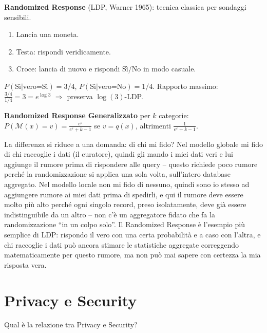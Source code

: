 \documentclass[a4paper,11pt]{article}
\begin{document}
\textbf{Randomized Response} (LDP, Warner 1965): tecnica classica per sondaggi sensibili.
\begin{enumerate}
  \item Lancia una moneta.
  \item Testa: rispondi veridicamente.
  \item Croce: lancia di nuovo e rispondi S\`{i}/No in modo casuale.
\end{enumerate}
$P(\text{S\`{i}}|\text{vero=S\`{i}}) = 3/4$, $P(\text{S\`{i}}|\text{vero=No}) = 1/4$. Rapporto massimo: $\frac{3/4}{1/4} = 3 = e^{\log 3}$ $\Rightarrow$ preserva $\log(3)$-LDP.

\textbf{Randomized Response Generalizzato} per $k$ categorie: $P(\mathcal{M}(x) = v) = \frac{e^\varepsilon}{e^\varepsilon + k - 1}$ se $v = q(x)$, altrimenti $\frac{1}{e^\varepsilon + k - 1}$.

\begin{nota}
La differenza si riduce a una domanda: di chi mi fido? Nel modello globale mi fido di chi raccoglie i dati (il curatore), quindi gli mando i miei dati veri e lui aggiunge il rumore prima di rispondere alle query -- questo richiede poco rumore perch\'{e} la randomizzazione si applica una sola volta, sull'intero database aggregato. Nel modello locale non mi fido di nessuno, quindi sono io stesso ad aggiungere rumore ai miei dati prima di spedirli, e qui il rumore deve essere molto pi\`{u} alto perch\'{e} ogni singolo record, preso isolatamente, deve gi\`{a} essere indistinguibile da un altro -- non c'\`{e} un aggregatore fidato che fa la randomizzazione ``in un colpo solo''. Il Randomized Response \`{e} l'esempio pi\`{u} semplice di LDP: rispondo il vero con una certa probabilit\`{a} e a caso con l'altra, e chi raccoglie i dati pu\`{o} ancora stimare le statistiche aggregate correggendo matematicamente per questo rumore, ma non pu\`{o} mai sapere con certezza la mia risposta vera.
\end{nota}

\section{Privacy e Security}

\begin{domanda}
Qual \`{e} la relazione tra Privacy e Security?
\end{domanda}
\end{document}
